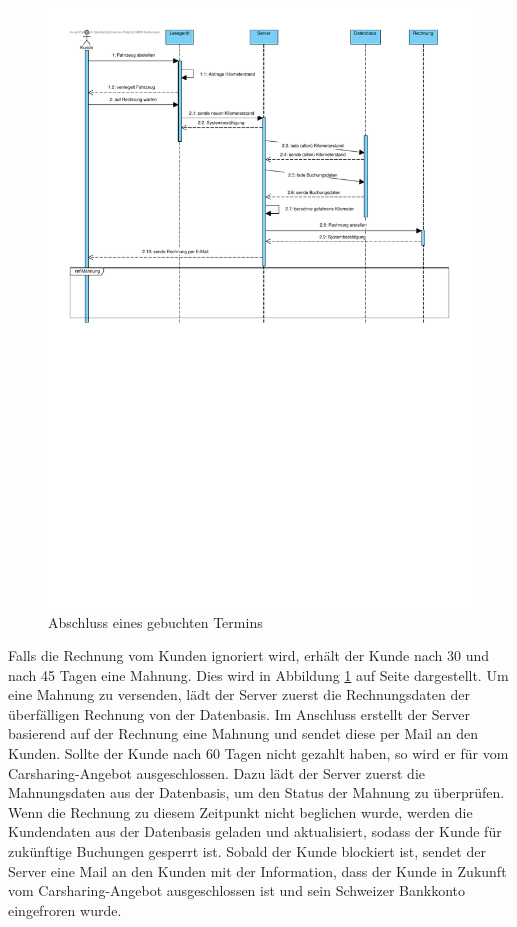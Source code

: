 \begin{figure}[!ht]
    \centering
    \includegraphics[width=\textwidth, trim = 0cm 14cm 0cm 0cm]{Bilder/Diagramme/SD_Buchungsvorgang_03.pdf}
    \caption{Abschluss eines gebuchten Termins}
    \label{img:buchung03}
\end{figure}

Falls die Rechnung vom Kunden ignoriert wird, erhält der Kunde nach 30 und nach 45 Tagen eine Mahnung. Dies wird in Abbildung \ref{img:buchung03} auf Seite \pageref{img:buchung03} dargestellt. Um eine Mahnung zu versenden, lädt der Server zuerst die Rechnungsdaten der überfälligen Rechnung von der Datenbasis.
Im Anschluss erstellt der Server basierend auf der Rechnung eine Mahnung und sendet diese per Mail an den Kunden. Sollte der Kunde nach 60 Tagen nicht gezahlt haben, so wird er für vom Carsharing-Angebot ausgeschlossen. Dazu lädt der Server zuerst die Mahnungsdaten aus der Datenbasis, um den Status der Mahnung zu überprüfen. Wenn die Rechnung zu diesem Zeitpunkt nicht beglichen wurde, werden die Kundendaten aus der Datenbasis geladen und aktualisiert, sodass der Kunde für zukünftige Buchungen gesperrt ist. Sobald der Kunde blockiert ist, sendet der Server eine Mail an den Kunden mit der Information, dass der Kunde in Zukunft vom Carsharing-Angebot ausgeschlossen ist und sein Schweizer Bankkonto eingefroren wurde.

